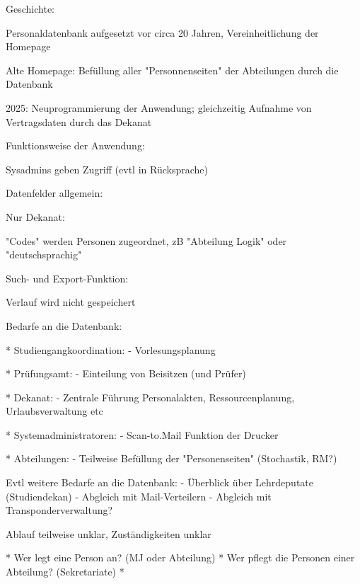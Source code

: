 

Geschichte: 

Personaldatenbank aufgesetzt vor circa 20 Jahren, Vereinheitlichung der Homepage

Alte Homepage: Befüllung aller "Personnenseiten" der Abteilungen durch die Datenbank

2025: Neuprogrammierung der Anwendung; gleichzeitig Aufnahme von Vertragsdaten durch das Dekanat



Funktionsweise der Anwendung: 

Sysadmins geben Zugriff (evtl in Rücksprache)

Datenfelder allgemein:

Nur Dekanat: 

"Codes" werden Personen zugeordnet, zB "Abteilung Logik" oder "deutschsprachig"

Such- und Export-Funktion:

Verlauf wird nicht gespeichert



Bedarfe an die Datenbank: 

* Studiengangkoordination: 
  - Vorlesungsplanung

* Prüfungsamt: 
  - Einteilung von Beisitzen (und Prüfer)

* Dekanat: 
  - Zentrale Führung Personalakten, Ressourcenplanung, Urlaubsverwaltung etc

* Systemadministratoren: 
  - Scan-to.Mail Funktion der Drucker

* Abteilungen: 
  - Teilweise Befüllung der "Personenseiten" (Stochastik, RM?)

Evtl weitere Bedarfe an die Datenbank: 
  - Überblick über Lehrdeputate (Studiendekan)
  - Abgleich mit Mail-Verteilern
  - Abgleich mit Transponderverwaltung?



Ablauf teilweise unklar, Zuständigkeiten unklar

* Wer legt eine Person an? (MJ oder Abteilung)
* Wer pflegt die Personen einer Abteilung? (Sekretariate)
* 